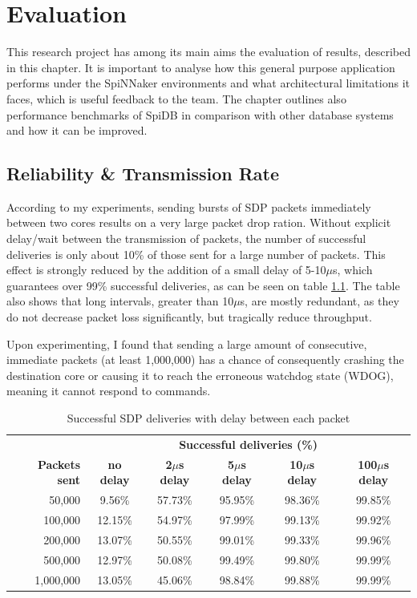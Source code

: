\chapter{Evaluation}
\label{cha:eval}
This research project has among its main aims the evaluation of results, described in this chapter. It is important to analyse how this general purpose application performs under the SpiNNaker environments and what architectural limitations it faces, which is useful feedback to the team. The chapter outlines also performance benchmarks of SpiDB in comparison with other database systems and how it can be improved.

\section{Reliability \& Transmission Rate}
\label{sec:eval_comm_rel}

According to my experiments, sending bursts of SDP packets immediately between two cores results on a very large packet drop ration. Without explicit delay/wait between the transmission of packets, the number of successful deliveries is only about 10\% of those sent for a large number of packets. This effect is strongly reduced by the addition of a small delay of 5-10$\mu$s, which guarantees over 99\% successful deliveries, as can be seen on table \ref{table:sdp_deliveries}. The table also shows that long intervals, greater than 10$\mu$s, are mostly redundant, as they do not decrease packet loss significantly, but tragically reduce throughput.

Upon experimenting, I found that sending a large amount of consecutive, immediate packets (at least 1,000,000) has a chance of consequently crashing the destination core or causing it to reach the erroneous watchdog state (WDOG), meaning it cannot respond to commands.

\begin{table}
\begin{tabular}{ r | c | c | c | c | c }
 & \multicolumn{5}{c}{\textbf{Successful deliveries (\%)}} \\

\textbf{Packets sent} & \textbf{no delay} & \textbf{2$\mu$s delay} & \textbf{5$\mu$s delay} & \textbf{10$\mu$s delay} & \textbf{100$\mu$s delay} \\
50,000 & 9.56\% & 57.73\% & 95.95\% & 98.36\% & 99.85\% \\
100,000 & 12.15\% & 54.97\% & 97.99\% & 99.13\% & 99.92\% \\
200,000 & 13.07\% & 50.55\% & 99.01\% & 99.33\% & 99.96\% \\
500,000 & 12.97\% & 50.08\% & 99.49\% & 99.80\% & 99.99\% \\
1,000,000 & 13.05\% & 45.06\% & 98.84\% & 99.88\% & 99.99\% \\
\end{tabular}
\caption{Successful SDP deliveries with delay between each packet}
\label{table:sdp_deliveries}
\end{table}

